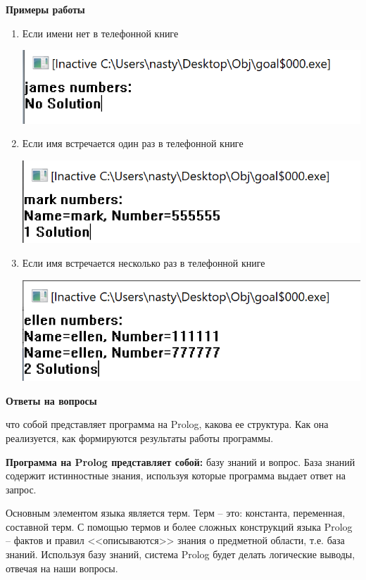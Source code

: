 \documentclass[a4paper,14pt]{extreport} %
\begin{document}
\textbf{Примеры работы}

\begin{enumerate}
\item Если имени нет в телефонной книге

\includegraphics{ex1}

\item Если имя встречается один раз в телефонной книге

\includegraphics{ex2}

\newpage

\item Если имя встречается несколько раз в телефонной книге

\includegraphics{ex3}
\end{enumerate}

\textbf{Ответы на вопросы}

что собой представляет программа на Prolog, какова ее структура. Как она реализуется, как формируются результаты работы программы. 

\textbf{Программа на Prolog представляет собой:} базу знаний и вопрос. База знаний содержит истинностные знания, используя которые программа выдает ответ на запрос. 

Основным элементом языка является терм. Терм – это: константа, переменная, составной терм. С помощью термов и более сложных конструкций языка Prolog – фактов и правил <<описываются>> знания о предметной области, т.е. база знаний. Используя базу знаний, система Prolog будет делать логические выводы, отвечая на наши вопросы. 
\end{document}
